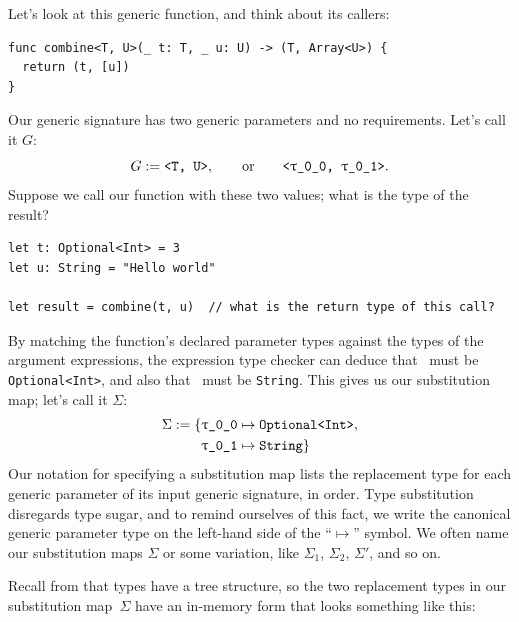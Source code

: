 \documentclass[../generics]{subfiles}
\begin{document}
\begin{example}
Let's look at this generic function, and think about its callers:
\begin{Verbatim}
func combine<T, U>(_ t: T, _ u: U) -> (T, Array<U>) {
  return (t, [u])
}
\end{Verbatim}
Our generic signature has two generic parameters and no requirements. Let's call it $G$:
\[G := \texttt{<T, U>}, \qquad \text{or} \qquad \texttt{<\rT, \rU>}.\]
Suppose we call our function with these two values; what is the type of the result?
\begin{Verbatim}
let t: Optional<Int> = 3
let u: String = "Hello world"

let result = combine(t, u)  // what is the return type of this call?
\end{Verbatim}
By matching the function's declared parameter types against the types of the argument expressions, the expression type checker can deduce that \tT~must be \texttt{Optional<Int>}, and also that \tU~must be \texttt{String}. This gives us our substitution map; let's call it $\Sigma$:
\begin{align*}
\Sigma := \{&\SubstType{\rT}{Optional<Int>},\\
&\SubstType{\rU}{String}\}
\end{align*}
Our notation for specifying a substitution map lists the replacement type for each generic parameter of its input generic signature, in order. Type substitution disregards type sugar, and to remind ourselves of this fact, we write the canonical generic parameter type on the left-hand side of the ``$\mapsto$'' symbol. We often name our substitution maps $\Sigma$ or some variation, like $\Sigma_1$, $\Sigma_2$, $\Sigma'$, and so on.

Recall from  that types have a tree structure, so the two replacement types in our substitution map~$\Sigma$ have an in-memory form that looks something like this:
\begin{center}
\end{center}
\end{example}
\end{document}
